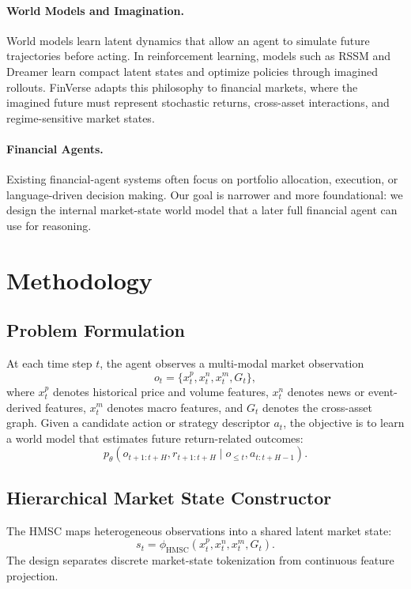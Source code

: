 \documentclass[letterpaper]{article}
\begin{document}
\paragraph{World Models and Imagination.}
World models learn latent dynamics that allow an agent to simulate future trajectories before acting. In reinforcement learning, models such as RSSM and Dreamer learn compact latent states and optimize policies through imagined rollouts. FinVerse adapts this philosophy to financial markets, where the imagined future must represent stochastic returns, cross-asset interactions, and regime-sensitive market states.

\paragraph{Financial Agents.}
Existing financial-agent systems often focus on portfolio allocation, execution, or language-driven decision making. Our goal is narrower and more foundational: we design the internal market-state world model that a later full financial agent can use for reasoning.

\section{Methodology}
\subsection{Problem Formulation}
At each time step $t$, the agent observes a multi-modal market observation
\begin{equation}
    o_t = \{x_t^{p}, x_t^{n}, x_t^{m}, G_t\},
\end{equation}
where $x_t^{p}$ denotes historical price and volume features, $x_t^{n}$ denotes news or event-derived features, $x_t^{m}$ denotes macro features, and $G_t$ denotes the cross-asset graph. Given a candidate action or strategy descriptor $a_t$, the objective is to learn a world model that estimates future return-related outcomes:
\begin{equation}
    p_\theta(o_{t+1:t+H}, r_{t+1:t+H} \mid o_{\leq t}, a_{t:t+H-1}).
\end{equation}

\subsection{Hierarchical Market State Constructor}
The HMSC maps heterogeneous observations into a shared latent market state:
\begin{equation}
    s_t = \phi_{\mathrm{HMSC}}(x_t^{p}, x_t^{n}, x_t^{m}, G_t).
\end{equation}
The design separates discrete market-state tokenization from continuous feature projection.
\end{document}
